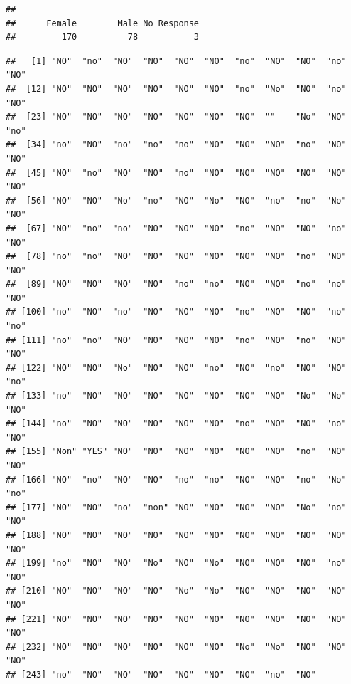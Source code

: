 \documentclass[]{book}
\newenvironment{Shaded}{\begin{snugshade}}{\end{snugshade}}
\newcommand{\CommentTok}[1]{\textcolor[rgb]{0.56,0.35,0.01}{\textit{#1}}}
\newcommand{\OperatorTok}[1]{\textcolor[rgb]{0.81,0.36,0.00}{\textbf{#1}}}
\newcommand{\NormalTok}[1]{#1}
\theoremstyle{definition}
\theoremstyle{definition}
\theoremstyle{definition}
\theoremstyle{remark}
\begin{document}
\begin{verbatim}
## 
##      Female        Male No Response 
##         170          78           3
\end{verbatim}

\begin{Shaded}
\end{Shaded}

\begin{verbatim}
##   [1] "NO"  "no"  "NO"  "NO"  "NO"  "NO"  "no"  "NO"  "NO"  "no"  "NO" 
##  [12] "NO"  "NO"  "NO"  "NO"  "NO"  "NO"  "no"  "No"  "NO"  "no"  "NO" 
##  [23] "NO"  "NO"  "NO"  "NO"  "NO"  "NO"  "NO"  ""    "No"  "NO"  "no" 
##  [34] "no"  "NO"  "no"  "no"  "no"  "NO"  "NO"  "NO"  "no"  "NO"  "NO" 
##  [45] "NO"  "no"  "NO"  "NO"  "no"  "NO"  "NO"  "NO"  "NO"  "NO"  "NO" 
##  [56] "NO"  "NO"  "No"  "no"  "NO"  "No"  "NO"  "no"  "no"  "No"  "NO" 
##  [67] "NO"  "no"  "no"  "NO"  "NO"  "NO"  "no"  "NO"  "NO"  "no"  "NO" 
##  [78] "no"  "no"  "NO"  "NO"  "NO"  "NO"  "NO"  "NO"  "no"  "NO"  "NO" 
##  [89] "NO"  "NO"  "NO"  "NO"  "no"  "no"  "NO"  "NO"  "no"  "no"  "NO" 
## [100] "no"  "NO"  "no"  "NO"  "NO"  "NO"  "no"  "NO"  "NO"  "no"  "no" 
## [111] "no"  "no"  "NO"  "NO"  "NO"  "NO"  "no"  "NO"  "no"  "NO"  "NO" 
## [122] "NO"  "NO"  "No"  "NO"  "NO"  "no"  "NO"  "no"  "NO"  "NO"  "no" 
## [133] "no"  "NO"  "NO"  "NO"  "NO"  "NO"  "NO"  "NO"  "No"  "No"  "NO" 
## [144] "no"  "NO"  "NO"  "NO"  "NO"  "NO"  "no"  "NO"  "NO"  "no"  "NO" 
## [155] "Non" "YES" "NO"  "NO"  "NO"  "NO"  "NO"  "NO"  "no"  "NO"  "NO" 
## [166] "NO"  "no"  "NO"  "NO"  "no"  "no"  "NO"  "NO"  "no"  "No"  "no" 
## [177] "NO"  "NO"  "no"  "non" "NO"  "NO"  "NO"  "NO"  "No"  "no"  "NO" 
## [188] "NO"  "NO"  "NO"  "NO"  "NO"  "NO"  "NO"  "NO"  "NO"  "NO"  "NO" 
## [199] "no"  "NO"  "NO"  "No"  "NO"  "No"  "NO"  "NO"  "NO"  "no"  "NO" 
## [210] "NO"  "NO"  "NO"  "NO"  "No"  "No"  "NO"  "NO"  "NO"  "NO"  "NO" 
## [221] "NO"  "NO"  "NO"  "NO"  "NO"  "NO"  "NO"  "NO"  "NO"  "NO"  "NO" 
## [232] "NO"  "NO"  "NO"  "NO"  "NO"  "NO"  "No"  "No"  "NO"  "NO"  "NO" 
## [243] "no"  "NO"  "NO"  "NO"  "NO"  "NO"  "NO"  "no"  "NO"
\end{verbatim}
\end{document}
